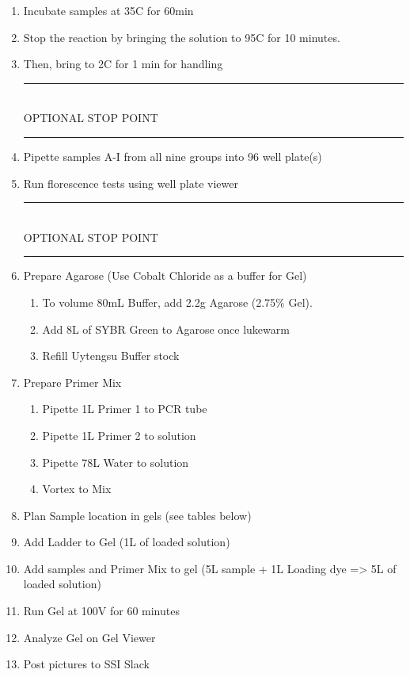 \documentclass[a4paper]{article}
\newcommand{\C}{\degree C}
\newcommand{\stopPoint}{\begin{center}
\rule{0.5\textwidth}{.4pt}\\
\vspace{1mm} 
OPTIONAL STOP POINT\\
\rule{0.5\textwidth}{.4pt}
\end{center}}
\newcommand{\uL}{\micro{}L}
\newcommand{\Dilution}[4]{
\subsection{#2}
\begin{enumerate}
\item{Vortex #2 stock}
\item{Pipette #1\uL{} #2 into a PCR Tube}
\item{Pipette #3\uL{} #4 into solution}
\item{Vortex until mixed}
\end{enumerate}
}
\begin{document}
\begin{enumerate}
\begin{figure}[ht]
Note: The dNTPs were originally supposed to be dTTPs, but due to human error, they were not. This is reflected in Figure \ref{table:instOne}.
\end{figure}

\section*{Dilutions}
\Dilution{1}{SYBR Green I}{9}{Water}
\Dilution{2.5}{Primer 1}{22.5}{Water}
\Dilution{2.5}{Primer 2}{22.5}{Water}

\item{Incubate samples at 35\C{} for 60min}
\item{Stop the reaction by bringing the solution to 95\C{} for 10 minutes. }
\item{Then, bring to 2\C{} for 1 min for handling}
\stopPoint
\item{Pipette samples A-I from all nine groups into 96 well plate(s)}
\item{Run florescence tests using well plate viewer}
\stopPoint
\item{Prepare Agarose (Use Cobalt Chloride as a buffer for Gel)
\begin{enumerate}
    \item{To volume 80mL Buffer, add 2.2g Agarose (2.75\% Gel).}
    \item{Add 8\uL{} of SYBR Green to Agarose once lukewarm}
    \item{Refill Uytengsu Buffer stock}
    \end{enumerate}
}

\item{Prepare Primer Mix
\begin{enumerate}
    \item{Pipette 1\uL{} Primer 1 to PCR tube}
    \item{Pipette 1\uL{} Primer 2 to solution }
    \item{Pipette 78\uL{} Water to solution}
    \item{Vortex to Mix}
    \end{enumerate}
    }
\item{Plan Sample location in gels (see tables below)}
\item{Add Ladder to Gel  (1\uL{} of loaded solution)}
\item{Add samples and Primer Mix to gel (5\uL{} sample + 1\uL{} Loading dye => 5\uL{} of loaded solution)}
\item{Run Gel at 100V for 60 minutes}
\item{Analyze Gel on Gel Viewer}
\item{Post pictures to SSI Slack}
\end{enumerate}
\end{document}
